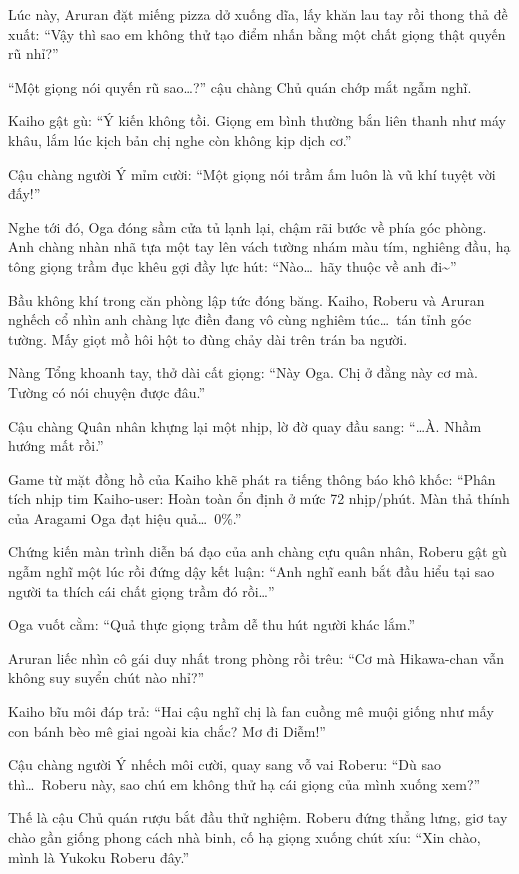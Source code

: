 \documentclass[../main.tex]{subfiles}
\begin{document}
Lúc này, Aruran đặt miếng pizza dở xuống dĩa, lấy khăn lau tay rồi thong thả đề xuất: ``Vậy thì sao em không thử tạo điểm nhấn bằng một chất giọng thật quyến rũ nhỉ?''

``Một giọng nói quyến rũ sao\dots?'' cậu chàng Chủ quán chớp mắt ngẫm nghĩ.

Kaiho gật gù: ``Ý kiến không tồi. Giọng em bình thường bắn liên thanh như máy khâu, lắm lúc kịch bản chị nghe còn không kịp dịch cơ.''

Cậu chàng người Ý mỉm cười: ``Một giọng nói trầm ấm luôn là vũ khí tuyệt vời đấy!''

Nghe tới đó, Oga đóng sầm cửa tủ lạnh lại, chậm rãi bước về phía góc phòng. Anh chàng nhàn nhã tựa một tay lên vách tường nhám màu tím, nghiêng đầu, hạ tông giọng trầm đục khêu gợi đầy lực hút: ``Nào\dots\ hãy thuộc về anh đi\~{}''

Bầu không khí trong căn phòng lập tức đóng băng. Kaiho, Roberu và Aruran nghếch cổ nhìn anh chàng lực điền đang vô cùng nghiêm túc\dots\ tán tỉnh góc tường. Mấy giọt mồ hôi hột to đùng chảy dài trên trán ba người.


Nàng Tổng khoanh tay, thở dài cất giọng: ``Này Oga. Chị ở đằng này cơ mà. Tường có nói chuyện được đâu.''

Cậu chàng Quân nhân khựng lại một nhịp, lờ đờ quay đầu sang: ``\dots À. Nhầm hướng mất rồi.''

Game từ mặt đồng hồ của Kaiho khẽ phát ra tiếng thông báo khô khốc: ``Phân tích nhịp tim Kaiho-user: Hoàn toàn ổn định ở mức 72 nhịp/phút. Màn thả thính của Aragami Oga đạt hiệu quả\dots\ 0\%.''

Chứng kiến màn trình diễn bá đạo của anh chàng cựu quân nhân, Roberu gật gù ngẫm nghĩ một lúc rồi đứng dậy kết luận: ``Anh nghĩ eanh bắt đầu hiểu tại sao người ta thích cái chất giọng trầm đó rồi\dots''

Oga vuốt cằm: ``Quả thực giọng trầm dễ thu hút người khác lắm.''

Aruran liếc nhìn cô gái duy nhất trong phòng rồi trêu: ``Cơ mà Hikawa-chan vẫn không suy suyển chút nào nhỉ?''

Kaiho bĩu môi đáp trả: ``Hai cậu nghĩ chị là fan cuồng mê muội giống như mấy con bánh bèo mê giai ngoài kia chắc? Mơ đi Diễm!''

Cậu chàng người Ý nhếch môi cười, quay sang vỗ vai Roberu: ``Dù sao thì\dots\ Roberu này, sao chú em không thử hạ cái giọng của mình xuống xem?''

Thế là cậu Chủ quán rượu bắt đầu thử nghiệm. Roberu đứng thẳng lưng, giơ tay chào gần giống phong cách nhà binh, cố hạ giọng xuống chút xíu: ``Xin chào, mình là Yukoku Roberu đây.''
\end{document}
